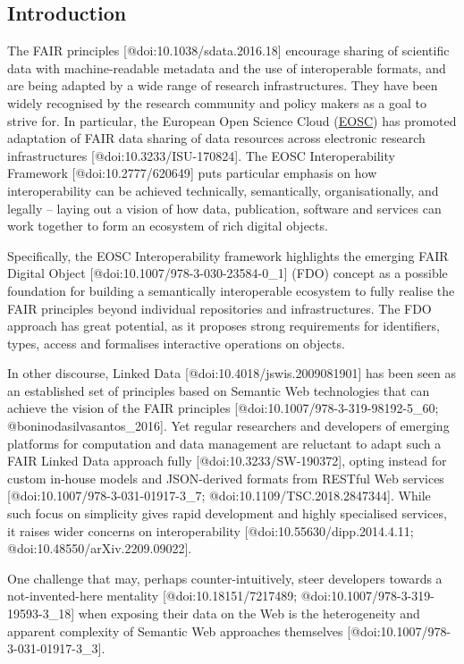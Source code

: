 \hypertarget{sec:introduction}{%
\subsection{Introduction}\label{sec:introduction}}

The FAIR principles {[}@doi:10.1038/sdata.2016.18{]} encourage sharing
of scientific data with machine-readable metadata and the use of
interoperable formats, and are being adapted by a wide range of research
infrastructures. They have been widely recognised by the research
community and policy makers as a goal to strive for. In particular, the
European Open Science Cloud (\href{https://www.eosc.eu/}{EOSC}) has
promoted adaptation of FAIR data sharing of data resources across
electronic research infrastructures {[}@doi:10.3233/ISU-170824{]}. The
EOSC Interoperability Framework {[}@doi:10.2777/620649{]} puts
particular emphasis on how interoperability can be achieved technically,
semantically, organisationally, and legally -- laying out a vision of
how data, publication, software and services can work together to form
an ecosystem of rich digital objects.

Specifically, the EOSC Interoperability framework highlights the
emerging FAIR Digital Object {[}@doi:10.1007/978-3-030-23584-0\_1{]}
(FDO) concept as a possible foundation for building a semantically
interoperable ecosystem to fully realise the FAIR principles beyond
individual repositories and infrastructures. The FDO approach has great
potential, as it proposes strong requirements for identifiers, types,
access and formalises interactive operations on objects.

In other discourse, Linked Data {[}@doi:10.4018/jswis.2009081901{]} has
been seen as an established set of principles based on Semantic Web
technologies that can achieve the vision of the FAIR principles
{[}@doi:10.1007/978-3-319-98192-5\_60; @boninodasilvasantos\_2016{]}.
Yet regular researchers and developers of emerging platforms for
computation and data management are reluctant to adapt such a FAIR
Linked Data approach fully {[}@doi:10.3233/SW-190372{]}, opting instead
for custom in-house models and JSON-derived formats from RESTful Web
services {[}@doi:10.1007/978-3-031-01917-3\_7;
@doi:10.1109/TSC.2018.2847344{]}. While such focus on simplicity gives
rapid development and highly specialised services, it raises wider
concerns on interoperability {[}@doi:10.55630/dipp.2014.4.11;
@doi:10.48550/arXiv.2209.09022{]}.

One challenge that may, perhaps counter-intuitively, steer developers
towards a not-invented-here mentality {[}@doi:10.18151/7217489;
@doi:10.1007/978-3-319-19593-3\_18{]} when exposing their data on the
Web is the heterogeneity and apparent complexity of Semantic Web
approaches themselves {[}@doi:10.1007/978-3-031-01917-3\_3{]}.

